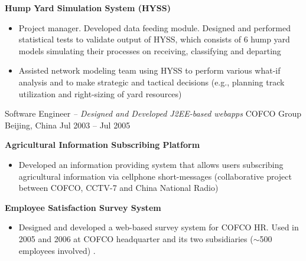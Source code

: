 \begin{cventries}
{\begin{cvitems}
{\begin{itemize}
\begin{itemize}
            \end{itemize}
        \end{itemize} 
	}
    \item {
        \textbf{Hump Yard Simulation System (HYSS)} 
        \begin{itemize}
        \item  Project manager. Developed data feeding module. Designed and performed statistical tests to validate output of HYSS,
              which consists of 6 hump yard models simulating their processes on receiving, classifying and departing
        \item  Assisted network modeling team using HYSS to perform various what-if analysis and to make strategic and tactical decisions (e.g., planning track utilization and right-sizing of yard resources)
        \end{itemize}     
    }
    \end{cvitems}
}


\cventry
{Software Engineer \textit{ -- Designed and Developed J2EE-based webapps}}                   %
{COFCO Group}                         %
{Beijing, China}                      %
{Jul 2003 -- Jul 2005}                %
{
    \begin{cvitems}                          
    \item {
        \textbf{Agricultural Information Subscribing Platform} 
        \begin{itemize}
            \item  Developed an information providing system that allows users subscribing agricultural information via cellphone short-messages
                   (collaborative project between COFCO, CCTV-7 and China National Radio)
        \end{itemize} 
	}          
    \item {
        \textbf{Employee Satisfaction Survey System }
        \begin{itemize}
            \item  Designed and developed a web-based survey system for COFCO HR. 
                   Used in 2005 and 2006 at COFCO headquarter and its two subsidiaries ($\sim$500 employees involved) .
        \end{itemize} 
	}        
    \end{cvitems}  %
}
\end{cventries}
